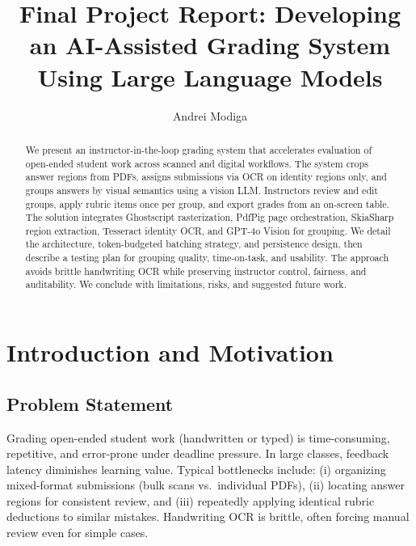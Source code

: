 \documentclass[ms,twoside,print]{nuthesis}
\begin{document}
\frontmatter

\title{Final Project Report: Developing an AI-Assisted Grading System Using Large Language Models}
\author{Andrei Modiga}

\maketitle

\begin{abstract}
We present an instructor-in-the-loop grading system that accelerates evaluation of open-ended student work across scanned and digital workflows. The system crops answer regions from PDFs, assigns submissions via OCR on identity regions only, and groups answers by visual semantics using a vision LLM. Instructors review and edit groups, apply rubric items once per group, and export grades from an on-screen table. The solution integrates Ghostscript rasterization, PdfPig page orchestration, SkiaSharp region extraction, Tesseract identity OCR, and GPT-4o Vision for grouping\cite{ghostscript,pdfpig,skiasharp,tesseract,openai-gpt4o}. We detail the architecture, token-budgeted batching strategy, and persistence design, then describe a testing plan for grouping quality, time-on-task, and usability. The approach avoids brittle handwriting OCR while preserving instructor control, fairness, and auditability. We conclude with limitations, risks, and suggested future work.
\end{abstract}

\setcounter{tocdepth}{2}
\tableofcontents
\listoffigures
\listoftables

\mainmatter

\chapter{Introduction and Motivation}
\section{Problem Statement}
Grading open-ended student work (handwritten or typed) is time-consuming, repetitive, and error-prone under deadline pressure. In large classes, feedback latency diminishes learning value. Typical bottlenecks include: (i) organizing mixed-format submissions (bulk scans vs.\ individual PDFs), (ii) locating answer regions for consistent review, and (iii) repeatedly applying identical rubric deductions to similar mistakes. Handwriting OCR is brittle, often forcing manual review even for simple cases.
\end{document}
